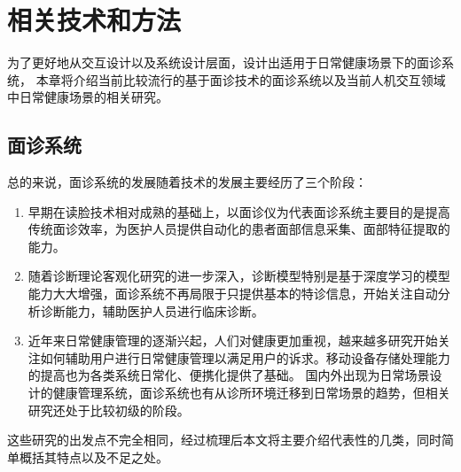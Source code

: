 \chapter{相关技术和方法}
为了更好地从交互设计以及系统设计层面，设计出适用于日常健康场景下的面诊系统，
本章将介绍当前比较流行的基于面诊技术的面诊系统以及当前人机交互领域中日常健康场景的相关研究。

\section{面诊系统}


总的来说，面诊系统的发展随着技术的发展主要经历了三个阶段：
\begin{enumerate}
    \item 早期在读脸技术相对成熟的基础上，以面诊仪为代表面诊系统主要目的是提高传统面诊效率，为医护人员提供自动化的患者面部信息采集、面部特征提取的能力。
    \item 随着诊断理论客观化研究的进一步深入，诊断模型特别是基于深度学习的模型能力大大增强，面诊系统不再局限于只提供基本的特诊信息，开始关注自动分析诊断能力，辅助医护人员进行临床诊断。
    \item 近年来日常健康管理的逐渐兴起，人们对健康更加重视，越来越多研究开始关注如何辅助用户进行日常健康管理以满足用户的诉求。移动设备存储处理能力的提高也为各类系统日常化、便携化提供了基础。
    国内外出现为日常场景设计的健康管理系统，面诊系统也有从诊所环境迁移到日常场景的趋势，但相关研究还处于比较初级的阶段。
\end{enumerate}

这些研究的出发点不完全相同，经过梳理后本文将主要介绍代表性的几类，同时简单概括其特点以及不足之处。

